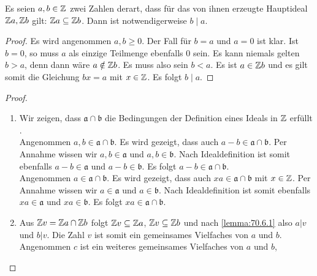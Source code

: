 \begin{lemma}
  \label{lemma:70.6.1}
  Es seien $a,b \in \mathbb{Z}$ zwei Zahlen derart, dass für das von ihnen
  erzeugte Hauptideal $\mathbb{Z}{}a, \mathbb{Z}{}b$ gilt:
  $\mathbb{Z}{}a \subseteq \mathbb{Z}{}b$.
  Dann ist notwendigerweise $b \mid a$.
\end{lemma}
\begin{proof}
  Es wird \obda{} angenommen $a,b \geq 0$.
  Der Fall für $b = a$ und $a = 0$ ist klar. Ist $b = 0$, so muss $a$
  als einzige Teilmenge ebenfalls $0$ sein. Es kann niemals gelten $b > a$, denn
  dann wäre $a \notin \mathbb{Z}{}b$. Es muss also sein $b < a$.
  Es ist $a \in \mathbb{Z}{}b$ und
  es gilt somit die Gleichung $bx = a$ mit $x \in \mathbb{Z}$.
  Es folgt $b \mid a$.
\end{proof}
\begin{proof}
  \begin{enumerate}[label=\alph*)]
    \item Wir zeigen, dass $\mathfrak{a} \cap \mathfrak{b}$ die Bedingungen
          der Definition eines Ideals in $\mathbb{Z}$ erfüllt
          \parencite[60]{book:zahlentheorie}.\\
           Angenommen $a,b \in \mathfrak{a} \cap \mathfrak{b}$.
          Es wird gezeigt, dass auch $a - b \in \mathfrak{a} \cap \mathfrak{b}$.
          Per Annahme wissen wir $a,b \in \mathfrak{a}$ und $a,b \in \mathfrak{b}$.
          Nach Idealdefinition ist somit ebenfalls
          $a - b \in \mathfrak{a}$ und $a - b \in \mathfrak{b}$.
          Es folgt $a - b \in \mathfrak{a} \cap \mathfrak{b}$.\\
           Angenommen $a \in \mathfrak{a} \cap \mathfrak{b}$.
          Es wird gezeigt, dass auch $xa \in \mathfrak{a} \cap \mathfrak{b}$
          mit $x \in \mathbb{Z}$. Per Annahme wissen wir
          $a \in \mathfrak{a}$ und $a \in \mathfrak{b}$.
          Nach Idealdefinition ist somit ebenfalls
          $xa \in \mathfrak{a}$ und $xa \in \mathfrak{b}$.
          Es folgt $xa \in \mathfrak{a} \cap \mathfrak{b}$.
    \item Aus $\mathbb{Z}{}v = \mathbb{Z}{}a \cap \mathbb{Z}{}b$
          folgt $\mathbb{Z}{}v \subseteq \mathbb{Z}{}a$,
          $\mathbb{Z}{}v \subseteq \mathbb{Z}{}b$ und nach \autoref{lemma:70.6.1}
          also $a | v$ und $b | v$. Die Zahl $v$ ist somit
          ein gemeinsames Vielfaches von $a$ und $b$.
          Angenommen $c$ ist ein weiteres gemeinsames Vielfaches von $a$ und $b$,

\end{enumerate}
\end{proof}
